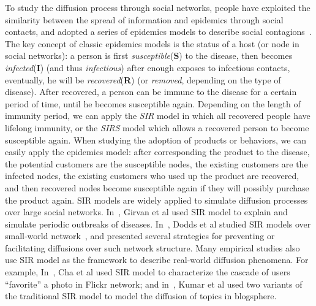 \documentclass[phd,tocprelim]{cornell}
\begin{document}
To study the diffusion process through social networks, people have exploited the similarity between the spread of information and epidemics through social contacts, and adopted a series of epidemics models to describe social contagions~\cite{bailey-1987}. The key concept of classic epidemics models is the status of a host (or node in social networks): a person is first \emph{susceptible}(\textbf{S}) to the disease, then becomes \emph{infected}(\textbf{I}) (and thus \emph{infectious}) after enough exposes to infectious contacts, eventually, he will be \emph{recovered}(\textbf{R}) (or \emph{removed}, depending on the type of disease). After recovered, a person can be immune to the disease for a certain period of time, until he becomes susceptible again. Depending on the length of immunity period, we can apply the \emph{SIR} model in which all recovered people have lifelong immunity, or the \emph{SIRS} model which allows a recovered person to become susceptible again. When studying the adoption of products or behaviors, we can easily apply the epidemics model: after corresponding the product to the disease, the potential customers are the susceptible nodes, the existing customers are the infected nodes, the existing customers who used up the product are recovered, and then recovered nodes become susceptible again if they will possibly purchase the product again. SIR models are widely applied to simulate diffusion processes over large social networks. In~\cite{Girvan-2002}, Girvan et al used SIR model to explain and simulate periodic outbreaks of diseases. In~\cite{Dodds:2005}, Dodds et al studied SIR models over small-world network~\cite{Watts-1998}, and presented several strategies for preventing or facilitating diffusions over such network structure. Many empirical studies also use SIR model as the framework to describe real-world diffusion phenomena. For example, In~\cite{Cha-2008}, Cha et al used SIR model to characterize the cascade of users ``favorite'' a photo in Flickr network; and in~\cite{Kumar-2004}, Kumar et al used two variants of the traditional SIR model to model the diffusion of topics in blogsphere.
\end{document}
